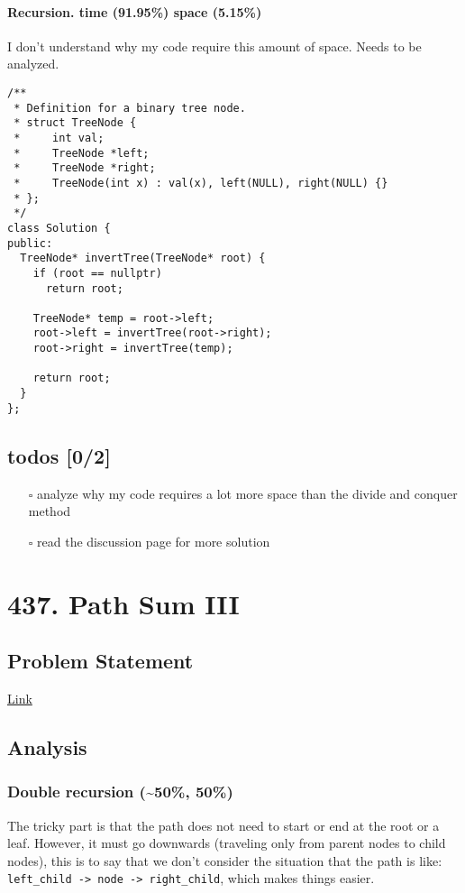 \documentclass[12pt]{book}
\begin{document}
\subsubsection{Recursion. time (91.95\%) space (5.15\%)}
\label{sec:orgef94a57}
I don't understand why my code require this amount of space. Needs to be analyzed.
\begin{verbatim}
/**
 * Definition for a binary tree node.
 * struct TreeNode {
 *     int val;
 *     TreeNode *left;
 *     TreeNode *right;
 *     TreeNode(int x) : val(x), left(NULL), right(NULL) {}
 * };
 */
class Solution {
public:
  TreeNode* invertTree(TreeNode* root) {
    if (root == nullptr)
      return root;

    TreeNode* temp = root->left;
    root->left = invertTree(root->right);
    root->right = invertTree(temp);

    return root;
  }
};
\end{verbatim}
\section{todos [0/2]}
\label{sec:orgdc6fd83}
\begin{itemize}
\item[{$\square$}] analyze why my code requires a lot more space than the divide and conquer method
\item[{$\square$}] read the discussion page for more solution
\end{itemize}
\chapter{437. Path Sum III}
\label{sec:org26ed16d}
\section{Problem Statement}
\label{sec:orgaf6d229}
\href{https://leetcode.com/problems/path-sum-iii/}{Link}
\section{Analysis}
\label{sec:org83ca097}
\subsection{Double recursion (\textasciitilde{}50\%, 50\%)}
\label{sec:org2de0d79}
The tricky part is that the path does not need to start or end at the root or a leaf. However, it must go downwards (traveling only from parent nodes to child nodes), this is to say that we don't consider the situation that the path is like: \texttt{left\_child -> node -> right\_child}, which makes things easier.
\end{document}
